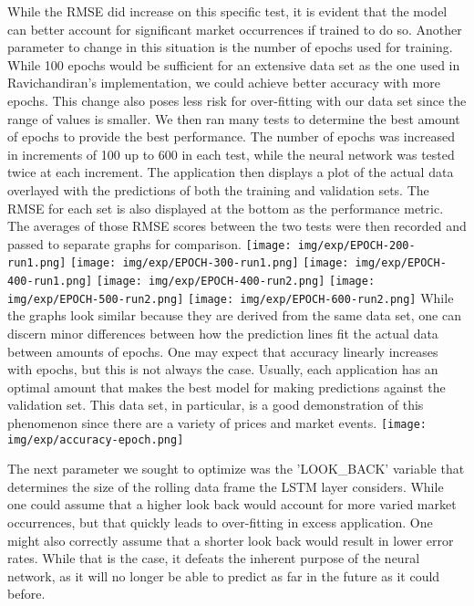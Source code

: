 \documentclass[compsoc]{IEEEtran}
\begin{document}
While the RMSE did increase on this specific test, it is evident that the model can better account for significant market occurrences if trained to do so. Another parameter to change in this situation is the number of epochs used for training. While 100 epochs would be sufficient for an extensive data set as the one used in Ravichandiran's implementation, we could achieve better accuracy with more epochs. This change also poses less risk for over-fitting with our data set since the range of values is smaller. We then ran many tests to determine the best amount of epochs to provide the best performance. The number of epochs was increased in increments of 100 up to 600 in each test, while the neural network was tested twice at each increment. The application then displays a plot of the actual data overlayed with the predictions of both the training and validation sets. The RMSE for each set is also displayed at the bottom as the performance metric. The averages of those RMSE scores between the two tests were then recorded and passed to separate graphs for comparison. 
\texttt{[image: img/exp/EPOCH-200-run1.png]}
\texttt{[image: img/exp/EPOCH-300-run1.png]}
\texttt{[image: img/exp/EPOCH-400-run1.png]}
\texttt{[image: img/exp/EPOCH-400-run2.png]}
\texttt{[image: img/exp/EPOCH-500-run2.png]}
\texttt{[image: img/exp/EPOCH-600-run2.png]}
While the graphs look similar because they are derived from the same data set, one can discern minor differences between how the prediction lines fit the actual data between amounts of epochs. One may expect that accuracy linearly increases with epochs, but this is not always the case. Usually, each application has an optimal amount that makes the best model for making predictions against the validation set. This data set, in particular, is a good demonstration of this phenomenon since there are a variety of prices and market events.
\texttt{[image: img/exp/accuracy-epoch.png]}

The next parameter we sought to optimize was the 'LOOK\_BACK' variable that determines the size of the rolling data frame the LSTM layer considers. While one could assume that a higher look back would account for more varied market occurrences, but that quickly leads to over-fitting in excess application. One might also correctly assume that a shorter look back would result in lower error rates. While that is the case, it defeats the inherent purpose of the neural network, as it will no longer be able to predict as far in the future as it could before. 
\end{document}
